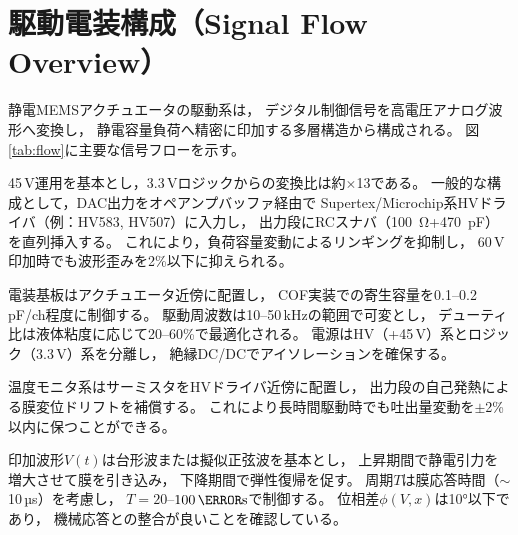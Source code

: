 \documentclass[conference]{IEEEtran}
\begin{document}
\section{駆動電装構成（Signal Flow Overview）}
静電MEMSアクチュエータの駆動系は，
デジタル制御信号を高電圧アナログ波形へ変換し，
静電容量負荷へ精密に印加する多層構造から構成される。
図\ref{tab:flow}に主要な信号フローを示す。

\begin{table}[t]
\centering
\caption{静電MEMSアクチュエータの駆動信号フロー構成}
\label{tab:flow}
\end{table}

45\,V運用を基本とし，3.3\,Vロジックからの変換比は約$\times$13である。
一般的な構成として，DAC出力をオペアンプバッファ経由で
Supertex/Microchip系HVドライバ（例：HV583, HV507）に入力し，
出力段にRCスナバ（\SI{100}{\ohm}+\SI{470}{pF}）を直列挿入する。
これにより，負荷容量変動によるリンギングを抑制し，
60\,V印加時でも波形歪みを2\%以下に抑えられる。

電装基板はアクチュエータ近傍に配置し，
COF実装での寄生容量を0.1--0.2\,pF/ch程度に制御する。
駆動周波数は10--50\,kHzの範囲で可変とし，
デューティ比は液体粘度に応じて20--60\%で最適化される。
電源はHV（+45\,V）系とロジック（3.3\,V）系を分離し，
絶縁DC/DCでアイソレーションを確保する。

温度モニタ系はサーミスタをHVドライバ近傍に配置し，
出力段の自己発熱による膜変位ドリフトを補償する。
これにより長時間駆動時でも吐出量変動を$\pm$2\%以内に保つことができる。

印加波形$V(t)$は台形波または擬似正弦波を基本とし，
上昇期間で静電引力を増大させて膜を引き込み，
下降期間で弾性復帰を促す。
周期$T$は膜応答時間（$\sim$10\,µs）を考慮し，
$T\!=\!20$--$100\,\mathrm{\micro s}$で制御する。
位相差$\phi(V,x)$は10°以下であり，
機械応答との整合が良いことを確認している。
\end{document}
